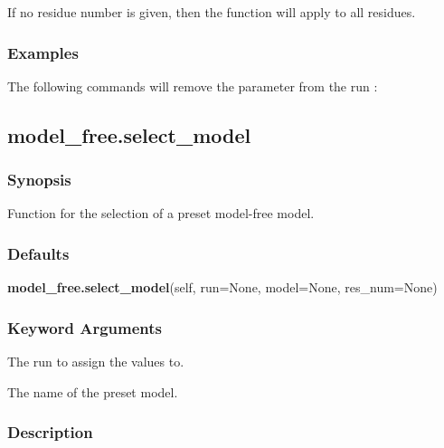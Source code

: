 If no residue number is given, then the function will apply to all residues.


\subsubsection{Examples}

The following commands will remove the parameter 
 from the run 
:





\newpage

\subsection{model\_free.select\_model}


\subsubsection{Synopsis}

Function for the selection of a preset model-free model.

\subsubsection{Defaults}

\textsf{\textbf{model\_free.select\_model}(self, run=None, model=None, res\_num=None)}


\subsubsection{Keyword Arguments}


  The run to assign the values to.

  The name of the preset model.

\subsubsection{Description}

